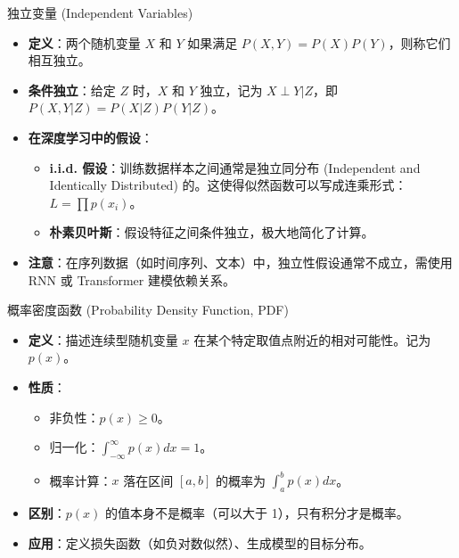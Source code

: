 \documentclass[12pt, aspectratio=169]{beamer}
\begin{document}
\begin{frame}{独立变量 (Independent Variables)}
    \begin{itemize}
        \item \textbf{定义}：两个随机变量 $X$ 和 $Y$ 如果满足 $P(X, Y) = P(X)P(Y)$，则称它们相互独立。
        \item \textbf{条件独立}：给定 $Z$ 时，$X$ 和 $Y$ 独立，记为 $X \perp Y | Z$，即 $P(X, Y|Z) = P(X|Z)P(Y|Z)$。
        \item \textbf{在深度学习中的假设}：
        \begin{itemize}
            \item \textbf{i.i.d. 假设}：训练数据样本之间通常是独立同分布 (Independent and Identically Distributed) 的。这使得似然函数可以写成连乘形式：$L = \prod p(x_i)$。
            \item \textbf{朴素贝叶斯}：假设特征之间条件独立，极大地简化了计算。
        \end{itemize}
        \item \textbf{注意}：在序列数据（如时间序列、文本）中，独立性假设通常不成立，需使用 RNN 或 Transformer 建模依赖关系。
    \end{itemize}
\end{frame}

\begin{frame}{概率密度函数 (Probability Density Function, PDF)}
    \begin{itemize}
        \item \textbf{定义}：描述连续型随机变量 $x$ 在某个特定取值点附近的相对可能性。记为 $p(x)$。
        \item \textbf{性质}：
        \begin{itemize}
            \item 非负性：$p(x) \ge 0$。
            \item 归一化：$\int_{-\infty}^{\infty} p(x) dx = 1$。
            \item 概率计算：$x$ 落在区间 $[a, b]$ 的概率为 $\int_a^b p(x) dx$。
        \end{itemize}
        \item \textbf{区别}：$p(x)$ 的值本身不是概率（可以大于 1），只有积分才是概率。
        \item \textbf{应用}：定义损失函数（如负对数似然）、生成模型的目标分布。
    \end{itemize}
\end{frame}
\end{document}
